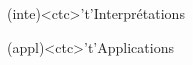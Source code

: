 \documentclass[../../main/main.tex]{subfiles}
\begin{document}
\begin{tcn}[sidebyside, fontupper=\small, fontlower=\small]
	\begin{tcn}(inte)<ctc>'t'{Interprétations}
	\end{tcn}
	\begin{tcn}(appl)<ctc>'t'{Applications}
	\end{tcn}

\end{tcn}
\end{document}
